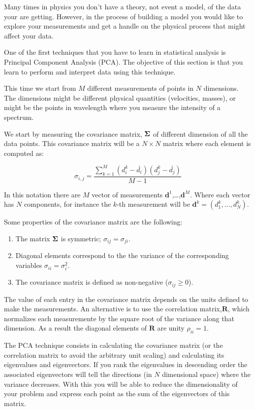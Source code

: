 \documentclass{article}
\begin{document}
Many times in physics you don't have a theory, not event a model, of the data your are getting. However, in the process of building a model you would like to explore your measurements and get a handle on the physical process that might affect your data.

One of the first techniques that you have to learn in statistical analysis is Principal Component Analysis (PCA). The objective of this section is that you learn to perform and interpret data using this technique.

This time we start from $M$ different measurements of points in $N$ dimensions. The dimensions might be different physical quantities (velocities, masses), or might be the points in wavelength where you measure the intensity of a spectrum.

We start by measuring the covariance matrix, ${\bf\Sigma}$ of different dimension of all the data points. This covariance matrix will be a $N\times N$ matrix where each element is computed as:

\begin{equation}
\sigma_{i,j} = \frac{\sum_{k=1}^{M} (d^{k}_i - \bar{d_i})(d^{k}_j -\bar{d_{j}})}{M-1}
\end{equation}

In this notation there are $M$ vector of measurements ${\mathbf d}^{1}$,\ldots,${\mathbf d}^{M}$. Where each vector has $N$ components, for instance the $k$-th measurement will be ${\mathbf d}^{k}=(d^k_{1},\ldots,d^k_{N})$.

Some properties of the covariance matrix are the following:
\begin{enumerate}
\item The matrix ${\bf\Sigma}$ is symmetric;
  $\sigma_{ij}=\sigma_{ji}$.
\item Diagonal elements correspond to the the variance of the
  corresponding variables $\sigma_{ii}=\sigma_i^2$.
\item The covariance matrix is defined as non-negative
  ($\sigma_{ij}\geq 0$).
\end{enumerate}

The value of each entry in the covariance matrix depends on the units
defined to make the measurements. An alternative is to use the
correlation matrix,${\mathbf R}$, which normalizes each measuremente
by the square root of the variance along that dimension. As a result
the diagonal elements of ${\mathbf R}$ are unity $\rho_{ii}=1$.

The PCA technique consists in calculating the covariance matrix (or
the correlation matrix to avoid the arbitrary unit scaling) and
calculating its eigenvalues and eigenvectors. If you rank the
eigenvalues in descending order the associated eigenvectors will tell
the directions (in $N$ dimensional space) where the variance
decreases. With this you will be able to reduce the dimensionality of
your problem and express each point as the sum of the eigenvectors of
this matrix.
\end{document}
